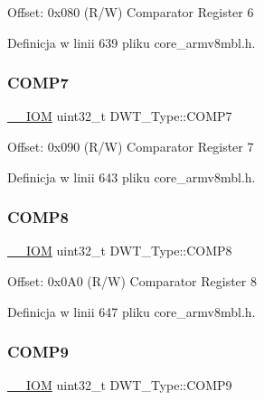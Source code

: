 Offset\+: 0x080 (R/W) Comparator Register 6 

Definicja w linii 639 pliku core\+\_\+armv8mbl.\+h.

\mbox{\label{struct_d_w_t___type_a46db6f5289d840f0b9886ae598352452}} 
\subsubsection{\texorpdfstring{C\+O\+M\+P7}{COMP7}}
{\footnotesize\ttfamily \hyperlink{core__sc300_8h_ab6caba5853a60a17e8e04499b52bf691}{\+\_\+\+\_\+\+I\+OM} uint32\+\_\+t D\+W\+T\+\_\+\+Type\+::\+C\+O\+M\+P7}

Offset\+: 0x090 (R/W) Comparator Register 7 

Definicja w linii 643 pliku core\+\_\+armv8mbl.\+h.

\mbox{\label{struct_d_w_t___type_aee138bc70746585e4ccf62557954c07f}} 
\subsubsection{\texorpdfstring{C\+O\+M\+P8}{COMP8}}
{\footnotesize\ttfamily \hyperlink{core__sc300_8h_ab6caba5853a60a17e8e04499b52bf691}{\+\_\+\+\_\+\+I\+OM} uint32\+\_\+t D\+W\+T\+\_\+\+Type\+::\+C\+O\+M\+P8}

Offset\+: 0x0\+A0 (R/W) Comparator Register 8 

Definicja w linii 647 pliku core\+\_\+armv8mbl.\+h.

\mbox{\label{struct_d_w_t___type_abf79b853fc2d25de9c03bdb183e4aee0}} 
\subsubsection{\texorpdfstring{C\+O\+M\+P9}{COMP9}}
{\footnotesize\ttfamily \hyperlink{core__sc300_8h_ab6caba5853a60a17e8e04499b52bf691}{\+\_\+\+\_\+\+I\+OM} uint32\+\_\+t D\+W\+T\+\_\+\+Type\+::\+C\+O\+M\+P9}

